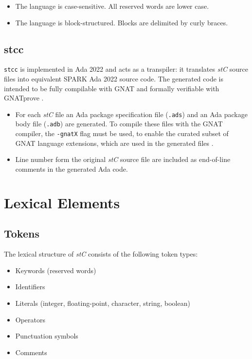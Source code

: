\documentclass[11pt,letterpaper,twoside,openany]{book}
\begin{document}
\begin{itemize}
\item The language is case-sensitive. All reserved words are lower case.

\item The language is block-structured. Blocks are delimited by curly braces.

\end{itemize}

\section{stcc}
\verb'stcc' is implemented in Ada 2022 and acts as a transpiler: it translates \emph{stC}
source files into equivalent SPARK Ada 2022 source code. The generated code is intended to
be fully compilable with GNAT and formally verifiable with GNATprove \cite{SparkAda}.

\begin{itemize}
\item For each \emph{stC} file an Ada package specification file (\verb'.ads') and an Ada package
body file (\verb'.adb') are generated. To compile these files with the GNAT compiler, the \verb'-gnatX' flag
must be used, to enable the curated subset of GNAT language extensions, which are used in the generated
files \cite{gnatX}.

\item Line number form the original \emph{stC} source file are included as end-of-line comments
in the generated Ada code.
\end{itemize}

\chapter{Lexical Elements}

\section{Tokens}
The lexical structure of \emph{stC} consists of the following token types:
\begin{itemize}
\item Keywords (reserved words)
\item Identifiers
\item Literals (integer, floating-point, character, string, boolean)
\item Operators
\item Punctuation symbols
\item Comments
\end{itemize}
\end{document}
